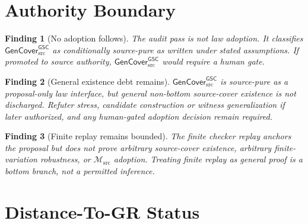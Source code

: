 \documentclass[11pt]{article}
\newcommand{\Msrc}{\mathcal{M}_{\mathrm{src}}}
\newcommand{\GenCover}{\mathsf{GenCover}_{\mathrm{src}}^{\mathsf{GSC}}}
\newtheorem{finding}{Finding}
\begin{document}
\section{Authority Boundary}

\begin{finding}[No adoption follows]
The audit pass is not law adoption. It classifies \(\GenCover\) as
conditionally source-pure as written under stated assumptions. If promoted to
source authority, \(\GenCover\) would require a human gate.
\end{finding}

\begin{finding}[General existence debt remains]
\(\GenCover\) is source-pure as a proposal-only law interface, but general
non-bottom source-cover existence is not discharged. Refuter stress,
candidate construction or witness generalization if later authorized, and any
human-gated adoption decision remain required.
\end{finding}

\begin{finding}[Finite replay remains bounded]
The finite checker replay anchors the proposal but does not prove arbitrary
source-cover existence, arbitrary finite-variation robustness, or
\(\Msrc\) adoption. Treating finite replay as general proof is a bottom
branch, not a permitted inference.
\end{finding}

\section{Distance-To-GR Status}
\end{document}
